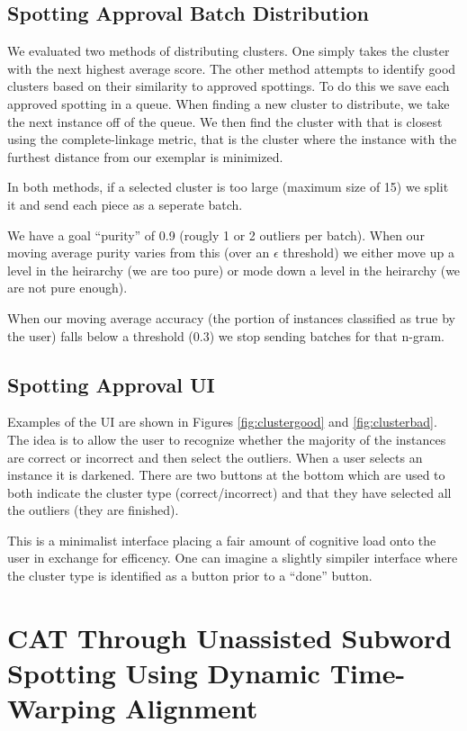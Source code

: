 \documentclass[ms,electronic,twosidetoc,letterpaper,chaptercenter,parttop,lol,lof,lot]{byumsphd}
\begin{document}
\subsection{Spotting Approval Batch Distribution}

We evaluated two methods of distributing clusters.
One simply takes the cluster with the next highest average score.
The other method attempts to identify good clusters based on their similarity to approved spottings. To do this we save each approved spotting in a queue. When finding a new cluster to distribute, we take the next instance off of the queue. We then find the cluster with that is closest using the complete-linkage metric, that is the cluster where the instance with the furthest distance from our exemplar is minimized.

In both methods, if a selected cluster is too large (maximum size of 15) we split it and send each piece as a seperate batch.

We have a goal ``purity'' of 0.9 (rougly 1 or 2 outliers per batch). When our moving average purity varies from this (over an $\epsilon$ threshold) we either move up a level in the heirarchy (we are too pure) or mode down a level in the heirarchy (we are not pure enough).

When our moving average accuracy (the portion of instances classified as true by the user) falls below a threshold (0.3) we stop sending batches for that n-gram.

\subsection{Spotting Approval UI}

Examples of the UI are shown in Figures \ref{fig:clustergood} and \ref{fig:clusterbad}. The idea is to allow the user to recognize whether the majority of the instances are correct or incorrect and then select the outliers. When a user selects an instance it is darkened. There are two buttons at the bottom which are used to both indicate the cluster type (correct/incorrect) and that they have selected all the outliers (they are finished).

This is a minimalist interface placing a fair amount of cognitive load onto the user in exchange for efficency. One can imagine a slightly simpiler interface where the cluster type is identified as a button prior to a ``done'' button.



\section{CAT Through Unassisted Subword Spotting Using Dynamic Time-Warping Alignment} %
\end{document}
